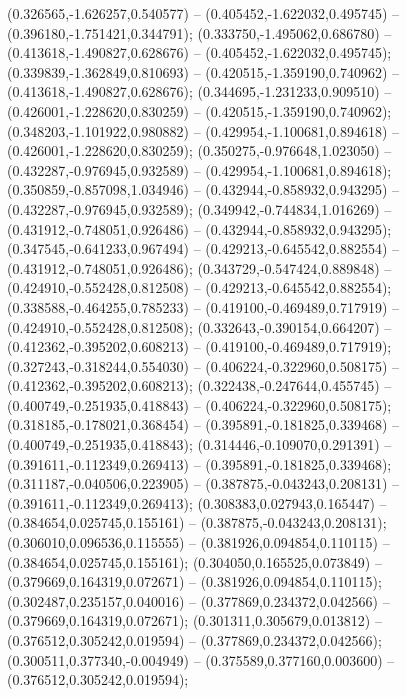  (0.326565,-1.626257,0.540577) -- (0.405452,-1.622032,0.495745) -- (0.396180,-1.751421,0.344791);
 (0.333750,-1.495062,0.686780) -- (0.413618,-1.490827,0.628676) -- (0.405452,-1.622032,0.495745);
 (0.339839,-1.362849,0.810693) -- (0.420515,-1.359190,0.740962) -- (0.413618,-1.490827,0.628676);
 (0.344695,-1.231233,0.909510) -- (0.426001,-1.228620,0.830259) -- (0.420515,-1.359190,0.740962);
 (0.348203,-1.101922,0.980882) -- (0.429954,-1.100681,0.894618) -- (0.426001,-1.228620,0.830259);
 (0.350275,-0.976648,1.023050) -- (0.432287,-0.976945,0.932589) -- (0.429954,-1.100681,0.894618);
 (0.350859,-0.857098,1.034946) -- (0.432944,-0.858932,0.943295) -- (0.432287,-0.976945,0.932589);
 (0.349942,-0.744834,1.016269) -- (0.431912,-0.748051,0.926486) -- (0.432944,-0.858932,0.943295);
 (0.347545,-0.641233,0.967494) -- (0.429213,-0.645542,0.882554) -- (0.431912,-0.748051,0.926486);
 (0.343729,-0.547424,0.889848) -- (0.424910,-0.552428,0.812508) -- (0.429213,-0.645542,0.882554);
 (0.338588,-0.464255,0.785233) -- (0.419100,-0.469489,0.717919) -- (0.424910,-0.552428,0.812508);
 (0.332643,-0.390154,0.664207) -- (0.412362,-0.395202,0.608213) -- (0.419100,-0.469489,0.717919);
 (0.327243,-0.318244,0.554030) -- (0.406224,-0.322960,0.508175) -- (0.412362,-0.395202,0.608213);
 (0.322438,-0.247644,0.455745) -- (0.400749,-0.251935,0.418843) -- (0.406224,-0.322960,0.508175);
 (0.318185,-0.178021,0.368454) -- (0.395891,-0.181825,0.339468) -- (0.400749,-0.251935,0.418843);
 (0.314446,-0.109070,0.291391) -- (0.391611,-0.112349,0.269413) -- (0.395891,-0.181825,0.339468);
 (0.311187,-0.040506,0.223905) -- (0.387875,-0.043243,0.208131) -- (0.391611,-0.112349,0.269413);
 (0.308383,0.027943,0.165447) -- (0.384654,0.025745,0.155161) -- (0.387875,-0.043243,0.208131);
 (0.306010,0.096536,0.115555) -- (0.381926,0.094854,0.110115) -- (0.384654,0.025745,0.155161);
 (0.304050,0.165525,0.073849) -- (0.379669,0.164319,0.072671) -- (0.381926,0.094854,0.110115);
 (0.302487,0.235157,0.040016) -- (0.377869,0.234372,0.042566) -- (0.379669,0.164319,0.072671);
 (0.301311,0.305679,0.013812) -- (0.376512,0.305242,0.019594) -- (0.377869,0.234372,0.042566);
 (0.300511,0.377340,-0.004949) -- (0.375589,0.377160,0.003600) -- (0.376512,0.305242,0.019594);
